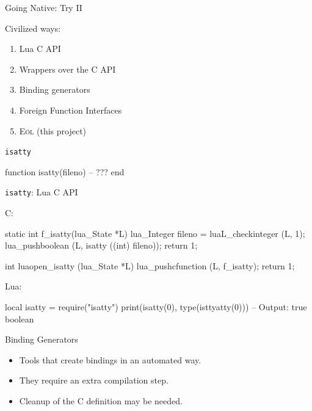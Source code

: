 \documentclass[luatex]{beamer}
\begin{document}
\begin{frame}{Going Native: Try II}

	Civilized ways:

	\begin{enumerate}
		\item Lua C API
		\item Wrappers over the C API
		\item Binding generators
		\item Foreign Function Interfaces
		\item \textsc{Eöl} (this project)
	\end{enumerate}

\end{frame}


\begin{frame}[fragile]{\texttt{isatty}}
\begin{luacode}
function isatty(fileno)
  -- ???
end
\end{luacode}
\end{frame}


\begin{frame}[fragile]{\texttt{isatty}: Lua C API}

C:

\begin{ccode}
static int f_isatty(lua_State *L) {
  lua_Integer fileno = luaL_checkinteger (L, 1);
  lua_pushboolean (L, isatty ((int) fileno));
  return 1;
}

int luaopen_isatty (lua_State *L) {
  lua_pushcfunction (L, f_isatty);
  return 1;
}
\end{ccode}

Lua:

\begin{luacode}
	local isatty = require("isatty")
	print(isatty(0), type(isttyatty(0)))
	-- Output: true boolean
\end{luacode}
\end{frame}


\begin{frame}{Binding Generators}
	\begin{itemize}
		\item Tools that create bindings in an automated way.
		\item<2-> They require an extra compilation step.
		\item<2-> Cleanup of the C definition may be needed.
	\end{itemize}

\end{frame}
\end{document}
